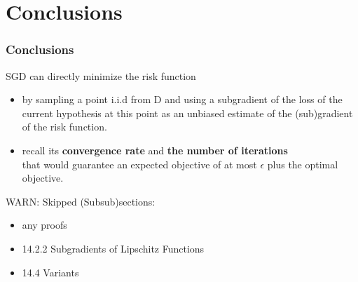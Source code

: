 \section{Conclusions}

\begin{frame}
\frametitle{Conclusions}

SGD can directly minimize the risk function
\begin{itemize}
    \item by sampling a point i.i.d from D and
        using a subgradient of the loss of the current hypothesis at this point as
    an unbiased estimate of the (sub)gradient of the risk function.
    \item recall its \textbf{convergence rate} and \textbf{the number of iterations} \\
    that would guarantee an expected objective of at most $\epsilon$ plus the optimal objective.
\end{itemize}
\vspace{5mm}

WARN: Skipped (Subsub)sections:\\
\begin{itemize}
    \item any proofs
    \item 14.2.2 Subgradients of Lipschitz Functions
    \item 14.4 Variants
\end{itemize}

\end{frame}

